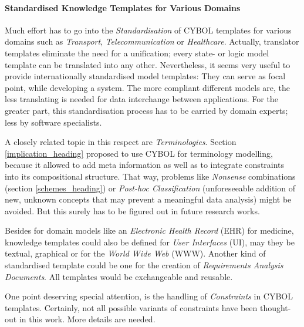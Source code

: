 %
%
%
%
%
%
%

\paragraph{Standardised Knowledge Templates for Various Domains}
\label{standardised_templates_heading}

Much effort has to go into the \emph{Standardisation} of CYBOL templates for
various domains such as \emph{Transport}, \emph{Telecommunication} or
\emph{Healthcare}. Actually, translator templates eliminate the need for a
unification; every state- or logic model template can be translated into any
other. Nevertheless, it seems very useful to provide internationally
standardised model templates: They can serve as focal point, while developing a
system. The more compliant different models are, the less translating is needed
for data interchange between applications. For the greater part, this
standardisation process has to be carried by domain experts; less by software
specialists.

A closely related topic in this respect are \emph{Terminologies}. Section
\ref{implication_heading} proposed to use CYBOL for terminology modelling,
because it allowed to add meta information as well as to integrate constraints
into its compositional structure. That way, problems like \emph{Nonsense}
combinations (section \ref{schemes_heading}) or \emph{Post-hoc Classification}
(unforeseeable addition of new, unknown concepts that may prevent a meaningful
data analysis) might be avoided. But this surely has to be figured out in
future research works.

Besides for domain models like an \emph{Electronic Health Record} (EHR)
\cite{openehr} for medicine, knowledge templates could also be defined for
\emph{User Interfaces} (UI), may they be textual, graphical or for the
\emph{World Wide Web} (WWW). Another kind of standardised template could be one
for the creation of \emph{Requirements Analysis Documents}. All templates would
be exchangeable and reusable.

One point deserving special attention, is the handling of \emph{Constraints} in
CYBOL templates. Certainly, not all possible variants of constraints have been
thought-out in this work. More details are needed.
